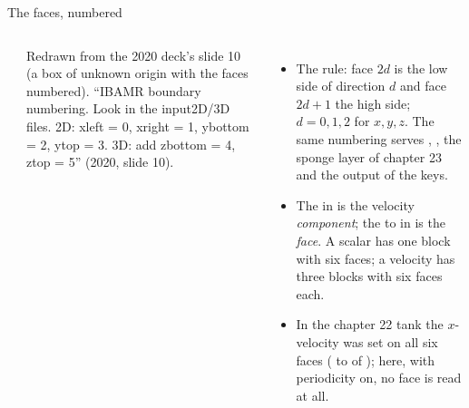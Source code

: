 \documentclass[aspectratio=169,11pt]{beamer}
\begin{document}
\begin{frame}{The faces, numbered}
\label{fr:faces}
\footnotesize
\begin{columns}[T]
\begin{center}
\end{center}
\scriptsize Redrawn from the 2020 deck's slide 10 (a box of unknown origin with the faces numbered).
``IBAMR boundary numbering. Look in the input2D/3D files. 2D: xleft = 0, xright = 1, ybottom = 2, ytop = 3. 3D: add zbottom = 4, ztop = 5'' (2020, slide 10).
\begin{itemize}
  \item The rule: face $2d$ is the low side of direction $d$ and face $2d + 1$ the high side; $d = 0, 1, 2$ for $x, y, z$. The same numbering serves , , the sponge layer of chapter 23 and the output of the  keys.
  \item The  in  is the velocity \emph{component}; the  to  in  is the \emph{face}. A scalar has one block with six faces; a velocity has three blocks with six faces each.
  \item In the chapter 22 tank the $x$-velocity was set on all six faces ( to  of ); here, with periodicity on, no face is read at all.
\end{itemize}
\end{columns}
\end{frame}
\end{document}
